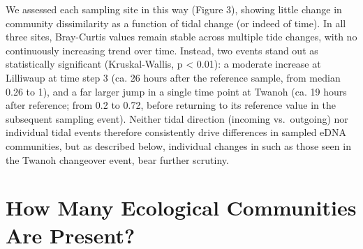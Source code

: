 \documentclass[fleqn,10pt,lineno]{wlpeerj} %
\begin{document}
We assessed each sampling site in this way (Figure 3), showing little
change in community dissimilarity as a function of tidal change (or
indeed of time). In all three sites, Bray-Curtis values remain stable
across multiple tide changes, with no continuously increasing trend over
time. Instead, two events stand out as statistically significant
(Kruskal-Wallis, p \textless{} 0.01): a moderate increase at Lilliwaup
at time step 3 (ca. 26 hours after the reference sample, from median
0.26 to 1), and a far larger jump in a single time point at Twanoh (ca.
19 hours after reference; from 0.2 to 0.72, before returning to its
reference value in the subsequent sampling event). Neither tidal
direction (incoming vs.~outgoing) nor individual tidal events therefore
consistently drive differences in sampled eDNA communities, but as
described below, individual changes in such as those seen in the Twanoh
changeover event, bear further scrutiny.

\section{How Many Ecological Communities Are
Present?}\label{how-many-ecological-communities-are-present}
\end{document}
